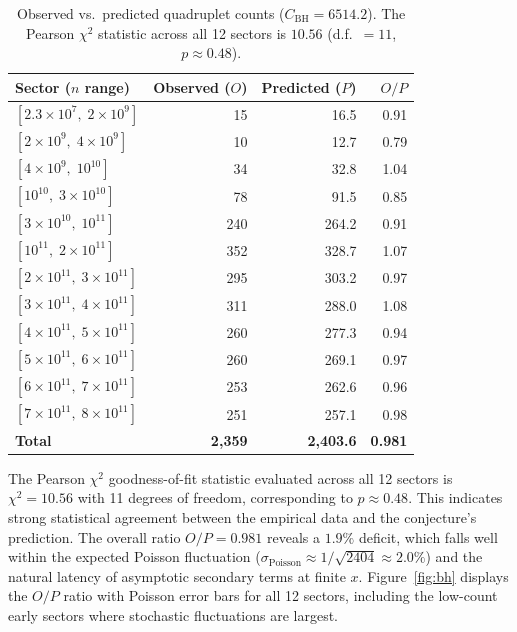 \documentclass[11pt, a4paper]{article}
\begin{document}
\begin{table}[H]
\centering
\caption{Observed vs.\ predicted quadruplet counts ($C_{\mathrm{BH}} = 6514.2$). The Pearson $\chi^2$ statistic across all 12 sectors is $10.56$ (d.f.\ $= 11$, $p \approx 0.48$).}
\label{tab:bh}
\small
\begin{tabular}{lrrr}
\toprule
\textbf{Sector ($n$ range)} & \textbf{Observed ($O$)} & \textbf{Predicted ($P$)} & $O/P$ \\
\midrule
$[2.3\!\times\!10^{7},\; 2\!\times\!10^{9}]$   & 15  & 16.5  & 0.91 \\
$[2\!\times\!10^{9},\; 4\!\times\!10^{9}]$      & 10  & 12.7  & 0.79 \\
$[4\!\times\!10^{9},\; 10^{10}]$                 & 34  & 32.8  & 1.04 \\
$[10^{10},\; 3\!\times\!10^{10}]$                & 78  & 91.5  & 0.85 \\
$[3\!\times\!10^{10},\; 10^{11}]$                & 240 & 264.2 & 0.91 \\
$[10^{11},\; 2\!\times\!10^{11}]$                & 352 & 328.7 & 1.07 \\
$[2\!\times\!10^{11},\; 3\!\times\!10^{11}]$     & 295 & 303.2 & 0.97 \\
$[3\!\times\!10^{11},\; 4\!\times\!10^{11}]$     & 311 & 288.0 & 1.08 \\
$[4\!\times\!10^{11},\; 5\!\times\!10^{11}]$     & 260 & 277.3 & 0.94 \\
$[5\!\times\!10^{11},\; 6\!\times\!10^{11}]$     & 260 & 269.1 & 0.97 \\
$[6\!\times\!10^{11},\; 7\!\times\!10^{11}]$     & 253 & 262.6 & 0.96 \\
$[7\!\times\!10^{11},\; 8\!\times\!10^{11}]$     & 251 & 257.1 & 0.98 \\
\midrule
\textbf{Total}                                     & \textbf{2{,}359} & \textbf{2{,}403.6} & \textbf{0.981} \\
\bottomrule
\end{tabular}
\end{table}

The Pearson $\chi^2$ goodness-of-fit statistic evaluated across all 12 sectors is $\chi^2 = 10.56$ with 11 degrees of freedom, corresponding to $p \approx 0.48$. This indicates strong statistical agreement between the empirical data and the conjecture's prediction. The overall ratio $O/P = 0.981$ reveals a $1.9\%$ deficit, which falls well within the expected Poisson fluctuation ($\sigma_{\mathrm{Poisson}} \approx 1/\sqrt{2404} \approx 2.0\%$) and the natural latency of asymptotic secondary terms at finite $x$. Figure~\ref{fig:bh} displays the $O/P$ ratio with Poisson error bars for all 12 sectors, including the low-count early sectors where stochastic fluctuations are largest.
\end{document}
